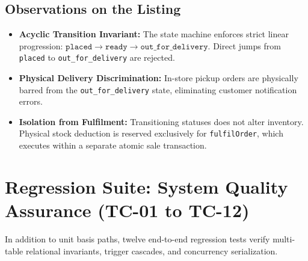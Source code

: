 \documentclass[12pt, a4paper]{report}
\begin{document}
\section{Observations on the Listing}
\begin{itemize}[leftmargin=1.5em]
  \item \textbf{Acyclic Transition Invariant:} The state machine enforces strict linear progression: $\texttt{placed} \to \texttt{ready} \to \texttt{out\_for\_delivery}$. Direct jumps from \texttt{placed} to \texttt{out\_for\_delivery} are rejected.
  \item \textbf{Physical Delivery Discrimination:} In-store pickup orders are physically barred from the \texttt{out\_for\_delivery} state, eliminating customer notification errors.
  \item \textbf{Isolation from Fulfilment:} Transitioning statuses does not alter inventory. Physical stock deduction is reserved exclusively for \texttt{fulfilOrder}, which executes within a separate atomic sale transaction.
\end{itemize}

\chapter{Regression Suite: System Quality Assurance (TC-01 to TC-12)}
In addition to unit basis paths, twelve end-to-end regression tests verify multi-table relational invariants, trigger cascades, and concurrency serialization.
\end{document}
